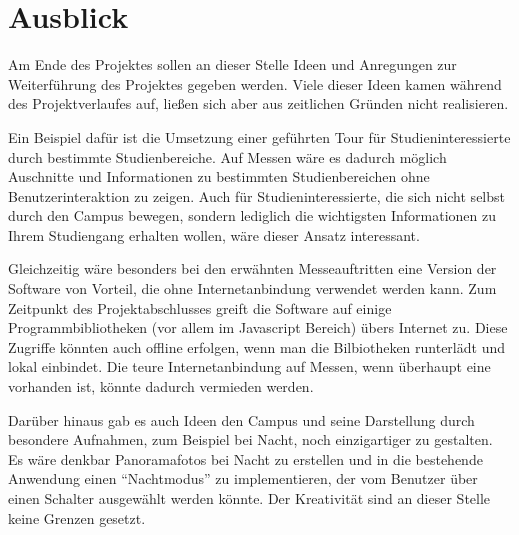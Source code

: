 \section{Ausblick}
\label{sec:Ausblick}

Am Ende des Projektes sollen an dieser Stelle Ideen und Anregungen zur Weiterführung des Projektes gegeben werden. Viele dieser Ideen kamen während des Projektverlaufes auf, ließen sich aber aus zeitlichen Gründen nicht realisieren.

Ein Beispiel dafür ist die Umsetzung einer geführten Tour für Studieninteressierte durch bestimmte Studienbereiche. Auf Messen wäre es dadurch möglich Auschnitte und Informationen zu bestimmten Studienbereichen ohne Benutzerinteraktion zu zeigen. Auch für Studieninteressierte, die sich nicht selbst durch den Campus bewegen, sondern lediglich die wichtigsten Informationen zu Ihrem Studiengang erhalten wollen, wäre dieser Ansatz interessant.

Gleichzeitig wäre besonders bei den erwähnten Messeauftritten eine Version der Software von Vorteil, die ohne Internetanbindung verwendet werden kann. Zum Zeitpunkt des Projektabschlusses greift die Software auf einige Programmbibliotheken (vor allem im Javascript Bereich) übers Internet zu. Diese Zugriffe könnten auch offline erfolgen, wenn man die Bilbiotheken runterlädt und lokal einbindet. Die teure Internetanbindung auf Messen, wenn überhaupt eine vorhanden ist, könnte dadurch vermieden werden.

Darüber hinaus gab es auch Ideen den Campus und seine Darstellung durch besondere Aufnahmen, zum Beispiel bei Nacht, noch einzigartiger zu gestalten. Es wäre denkbar Panoramafotos bei Nacht zu erstellen und in die bestehende Anwendung einen "`Nachtmodus"' zu implementieren, der vom Benutzer über einen Schalter ausgewählt werden könnte. Der Kreativität sind an dieser Stelle keine Grenzen gesetzt.